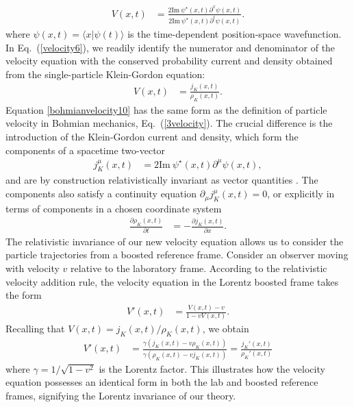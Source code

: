 \documentclass[
prx
,twocolumn
,nofootinbib
,floatfix
,superscriptaddress
]{revtex4-2}
\newcommand{\p}{\partial}
\begin{document}
\begin{align}\label{velocity6}
    V(x,t) &= \frac{2 \text{Im} \: \psi^\star(x,t) \p^x \psi(x,t)}{2 \text{Im} \: \psi^\star(x,t) \p^t  \psi(x,t)}.
\end{align}
where $\psi(x,t) = \langle x |\psi(t)\rangle$ is the time-dependent position-space wavefunction. In Eq.\ (\ref{velocity6}), we readily identify the numerator and denominator of the velocity equation with the conserved probability current and density obtained from the single-particle Klein-Gordon equation:
\begin{align}\label{bohmianvelocity10}
    V(x,t) &= \frac{j_{K}(x,t)}{\rho_{K} (x,t)}. 
\end{align}
Equation \ref{bohmianvelocity10} has the same form as the definition of particle velocity in Bohmian mechanics, Eq.\ (\ref{3velocity}). The crucial difference is the introduction of the Klein-Gordon current and density, which form the components of a spacetime two-vector
\begin{align}
    j_{K}^\mu (x,t) &= 2 \text{Im} \:  \psi^\star(x,t) \p^\mu \psi(x,t) ,
\end{align}
and are by construction relativistically invariant as vector quantities \cite{landau2013classical}. The components also satisfy a continuity equation $\p_\mu j_{K}^\mu(x,t) = 0$, or explicitly in terms of components in a chosen coordinate system 
\begin{align}
    \frac{\p \rho_{K}(x,t)}{\p t} &= - \frac{\p j_{K}(x,t)}{\p x}.
\end{align}
The relativistic invariance of our new velocity equation allows us to consider the particle trajectories from a boosted reference frame. Consider an observer moving with velocity $v$ relative to the laboratory frame. According to the relativistic velocity addition rule, the velocity equation in the Lorentz boosted frame takes the form
\begin{align}
    V'(x,t) &= \frac{V(x,t) - v}{1 - v V(x,t)} .
\end{align}
Recalling that $V(x,t) = j_K(x,t) /\rho_K(x,t)$, we obtain
\begin{align}
    V'(x,t) &= \frac{\gamma( j_K(x,t) - v \rho_K(x,t))}{\gamma(\rho_K(x,t) - vj_K(x,t) ) } = \frac{j_K'(x,t)}{\rho_K'(x,t)}
\end{align}
where $\gamma = 1/\sqrt{1-v^2}$ is the Lorentz factor. This illustrates how the velocity equation possesses an identical form in both the lab and boosted reference frames, signifying the Lorentz invariance of our theory. 
\end{document}
